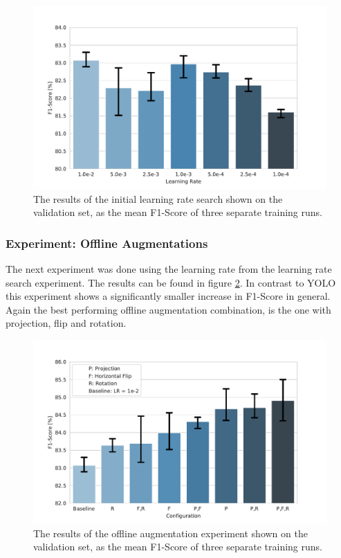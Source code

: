 \begin{figure}
\begin{center}
    \includegraphics[width=\columnwidth]{imgs/munet_lr_exp.pdf}
    \caption{The results of the initial learning rate search shown on the validation set, as the mean F1-Score of three separate training runs.}
    \label{fig:munet_lr_exp}
\end{center}
\end{figure}

\subsubsection{Experiment: Offline Augmentations}

The next experiment was done using the learning rate from the learning rate search experiment.
The results can be found in figure \ref{fig:munet_offline_exp}.
In contrast to YOLO this experiment shows a significantly smaller increase in F1-Score in general.
Again the best performing offline augmentation combination, is the one with projection, flip and rotation.

\begin{figure}
\begin{center}
    \includegraphics[width=\columnwidth]{imgs/munet_offline_aug_experiment.pdf}
    \caption{The results of the offline augmentation experiment shown on the validation set, as the mean F1-Score of three separate training runs.}
    \label{fig:munet_offline_exp}
\end{center}
\end{figure}

